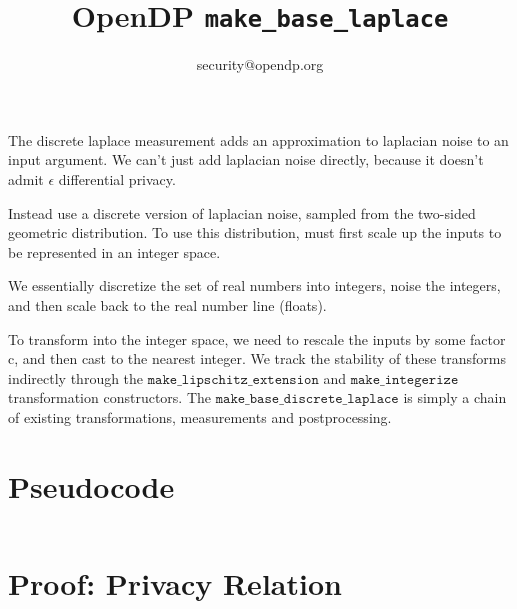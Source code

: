 

\title{OpenDP \texttt{make\_base\_laplace}}
\author{security@opendp.org}





\maketitle

The discrete laplace measurement adds an approximation to laplacian noise to an input argument.
We can't just add laplacian noise directly, because it doesn't admit $\epsilon$ differential privacy.

Instead use a discrete version of laplacian noise, sampled from the two-sided geometric distribution.
To use this distribution, must first scale up the inputs to be represented in an integer space.

We essentially discretize the set of real numbers into integers, noise the integers, and then scale back to the real number line (floats).

To transform into the integer space, we need to rescale the inputs by some factor c, and then cast to the nearest integer.
We track the stability of these transforms indirectly through the $\texttt{make\_lipschitz\_extension}$ and $\texttt{make\_integerize}$ transformation constructors.
The $\texttt{make\_base\_discrete\_laplace}$ is simply a chain of existing transformations, measurements and postprocessing.


\section{Pseudocode}
\label{sec:python-pseudocode}

\inputminted{python}{pseudocode.py}

\section{Proof: Privacy Relation}


